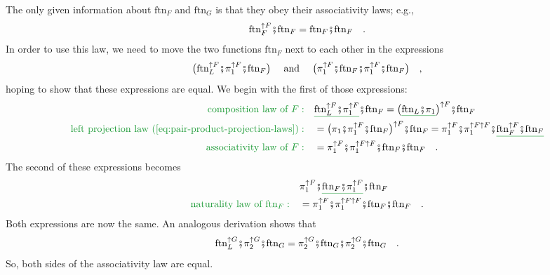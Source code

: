 The only given information about $\text{ftn}_{F}$ and $\text{ftn}_{G}$
is that they obey their associativity laws; e.g.,
\[
\text{ftn}_{F}^{\uparrow F}\bef\text{ftn}_{F}=\text{ftn}_{F}\bef\text{ftn}_{F}\quad.
\]
In order to use this law, we need to move the two functions $\text{ftn}_{F}$
next to each other in the expressions 
\[
\big(\text{ftn}_{L}^{\uparrow F}\bef\pi_{1}^{\uparrow F}\bef\text{ftn}_{F}\big)\quad\text{ and }\quad\big(\pi_{1}^{\uparrow F}\bef\text{ftn}_{F}\bef\pi_{1}^{\uparrow F}\bef\text{ftn}_{F}\big)\quad,
\]
hoping to show that these expressions are equal. We begin with the
first of those expressions:
\begin{align*}
{\color{greenunder}\text{composition law of }F:}\quad & \gunderline{\text{ftn}_{L}^{\uparrow F}\bef\pi_{1}^{\uparrow F}}\bef\text{ftn}_{F}=\big(\gunderline{\text{ftn}_{L}\bef\pi_{1}}\big)^{\uparrow F}\bef\text{ftn}_{F}\\
{\color{greenunder}\text{left projection law~(\ref{eq:pair-product-projection-laws})}:}\quad & =\big(\pi_{1}\bef\pi_{1}^{\uparrow F}\bef\text{ftn}_{F}\big)^{\uparrow F}\bef\text{ftn}_{F}=\pi_{1}^{\uparrow F}\bef\pi_{1}^{\uparrow F\uparrow F}\bef\gunderline{\text{ftn}_{F}^{\uparrow F}\bef\text{ftn}_{F}}\\
{\color{greenunder}\text{associativity law of }F:}\quad & =\pi_{1}^{\uparrow F}\bef\pi_{1}^{\uparrow F\uparrow F}\bef\text{ftn}_{F}\bef\text{ftn}_{F}\quad.
\end{align*}
The second of these expressions becomes
\begin{align*}
 & \pi_{1}^{\uparrow F}\bef\gunderline{\text{ftn}_{F}\bef\pi_{1}^{\uparrow F}}\bef\text{ftn}_{F}\\
{\color{greenunder}\text{naturality law of }\text{ftn}_{F}:}\quad & =\pi_{1}^{\uparrow F}\bef\pi_{1}^{\uparrow F\uparrow F}\bef\text{ftn}_{F}\bef\text{ftn}_{F}\quad.
\end{align*}
Both expressions are now the same. An analogous derivation shows that
\[
\text{ftn}_{L}^{\uparrow G}\bef\pi_{2}^{\uparrow G}\bef\text{ftn}_{G}=\pi_{2}^{\uparrow G}\bef\text{ftn}_{G}\bef\pi_{2}^{\uparrow G}\bef\text{ftn}_{G}\quad.
\]
So, both sides of the associativity law are equal.

